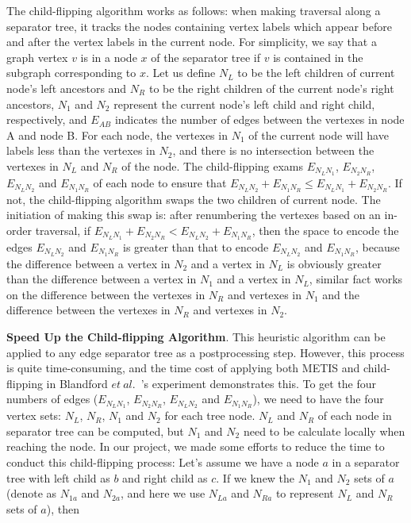 \documentclass[12pt,glossary]{dalthesis}
\begin{document}
\bigskip
\bigskip

The child-flipping algorithm works as follows: when making traversal along a separator tree, it tracks the nodes containing vertex labels which appear before and after the vertex labels in the current node. For simplicity, we say that a graph vertex $v$ is in a node $x$ of the separator tree if $v$ is contained in the subgraph corresponding to $x$. Let us define $N_{L}$ to be the left children of current node's left ancestors and $N_{R}$ to be the right children of the current node's right ancestors, $N_{1}$ and $N_{2}$ represent the current node's left child and right child, respectively, and $E_{AB}$ indicates the number of edges between the vertexes in node A and node B. For each node, the vertexes in $N_{1}$ of the current node will have labels less than the vertexes in $N_{2}$, and there is no intersection between the vertexes in $N_{L}$ and $N_{R}$ of the node. The child-flipping exams $E_{N_{L}N_{1}}$, $E_{N_{2}N_{R}}$, $E_{N_{L}N_{2}}$ and $E_{N_{1}N_{R}}$ of each node to ensure that $E_{N_{L}N_{2}} + E_{N_{1}N_{R}} \leq E_{N_{L}N_{1}} + E_{N_{2}N_{R}}$. If not, the child-flipping algorithm swaps the two children of current node. The initiation of making this swap is: after renumbering the vertexes based on an in-order traversal, if $E_{N_{L}N_{1}} + E_{N_{2}N_{R}} < E_{N_{L}N_{2}} + E_{N_{1}N_{R}}$, then the space to encode the edges $E_{N_{L}N_{2}}$ and $E_{N_{1}N_{R}}$ is greater than that to encode $E_{N_{L}N_{2}}$ and $E_{N_{1}N_{R}}$, because the difference between a vertex in $N_{2}$ and a vertex in $N_{L}$ is obviously greater than the difference between a vertex in $N_{1}$ and a vertex in $N_{L}$, similar fact works on the difference between the vertexes in $N_{R}$ and vertexes in $N_{1}$ and the difference between the vertexes in $N_{R}$ and vertexes in $N_{2}$.

\bigskip
\bigskip

\textbf{Speed Up the Child-flipping Algorithm}. This heuristic algorithm can be applied to any edge separator tree as a postprocessing step. However, this process is quite time-consuming, and the time cost of applying both METIS and child-flipping in Blandford $et \ al.$~\cite{compact-representation}'s experiment demonstrates this. To get the four numbers of edges ($E_{N_{L}N_{1}}$, $E_{N_{2}N_{R}}$, $E_{N_{L}N_{2}}$ and $E_{N_{1}N_{R}}$), we need to have the four vertex sets: $N_{L}$, $N_{R}$, $N_{1}$ and $N_{2}$ for each tree node. $N_{L}$ and $N_{R}$ of each node in separator tree can be computed, but $N_{1}$ and $N_{2}$ need to be calculate locally when reaching the node. In our project, we made some efforts to reduce the time to conduct this child-flipping process: Let's assume we have a node $a$ in a separator tree with left child as $b$ and right child as $c$. If we knew the $N_{1}$ and $N_{2}$ sets of $a$ (denote as $N_{1a}$ and $N_{2a}$, and here we use $N_{La}$ and $N_{Ra}$ to represent $N_{L}$ and $N_{R}$ sets of $a$), then
\end{document}
